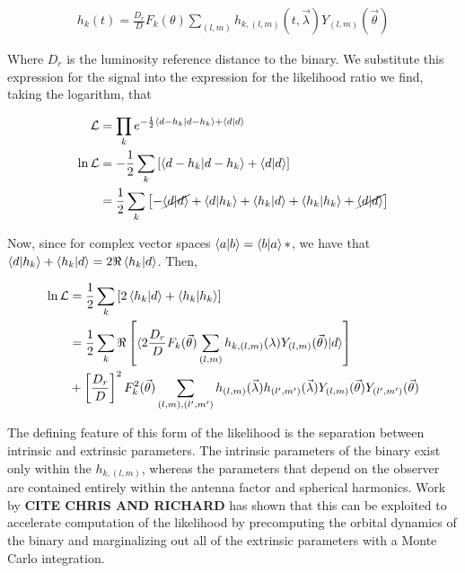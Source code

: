 \documentclass[paper=a4, fontsize=11pt]{scrartcl} %
\numberwithin{equation}{section} %
\numberwithin{figure}{section} %
\numberwithin{table}{section} %
\begin{document}
\begin{align}
h_k(t) = \frac{D_r}{D}F_k(\theta)\sum_{(l,m)}h_{k, (l,m)}(t, \vec{\lambda})Y_{(l,m)}(\vec{\theta})
\end{align}

Where $D_r$ is the luminosity reference distance to the binary. We substitute this expression for the signal into the expression for the likelihood ratio we find, taking the logarithm, that

\begin{align}
\mathcal{L} &= \prod_k e^{-\frac{1}{2}\braket{d - h_k|d-h_k} + \braket{d|d}} \\
\ln\mathcal{L} &= -\frac{1}{2}\sum_{k}\left[\braket{d - h_k|d-h_k} + \braket{d|d}\right] \\
&= \frac{1}{2}\sum_{k}\left[-\cancel{\braket{d|d}}+\braket{d|h_k}+\braket{h_k|d}+\braket{h_k|h_k} + \cancel{\braket{d|d}}\right] \\
\end{align}

Now, since for complex vector spaces $\braket{a|b} = \braket{b|a}*$, we have that $\braket{d|h_k} + \braket{h_k|d} = 2\Re\braket{h_k|d}$. Then, 

\begin{align}
\ln\mathcal{L} &= \frac{1}{2}\sum_{k}\left[2\braket{h_k|d} + \braket{h_k|h_k}\right] \\
&= \frac{1}{2} \sum_{k}\Re\left[\braket{2\frac{D_r}{D}F_k(\vec{\theta})\sum_{(l,m)}h_{k,(l,m)}(\lambda)Y_{(l,m)}(\vec{\theta})|d}\right] \\
&+ \left[\frac{D_r}{D}\right]^2F_k^2(\vec{\theta})\sum_{(l,m),(l',m')}h_{(l,m)}(\vec{\lambda})h_{(l',m')}(\vec{\lambda})Y_{(l,m)}(\vec{\theta})Y_{(l',m')}(\vec{\theta})
\end{align}  

The defining feature of this form of the likelihood is the separation between intrinsic and extrinsic parameters. The intrinsic parameters of the binary exist only within the $h_{k,(l,m)}$, whereas the parameters that depend on the observer are contained entirely within the antenna factor and spherical harmonics. Work by \textbf{CITE CHRIS AND RICHARD} has shown that this can be exploited to accelerate computation of the likelihood by precomputing the orbital dynamics of the binary and marginalizing out all of the extrinsic parameters with a Monte Carlo integration. 
\end{document}
